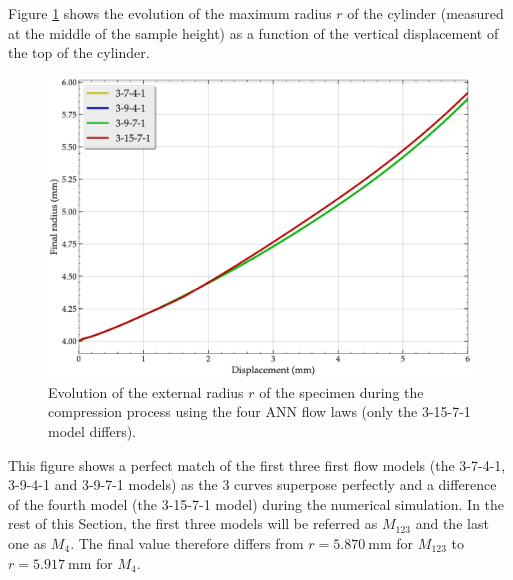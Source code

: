 \documentclass[algorithms,article,submit,pdftex,moreauthors]{Definitions/mdpi}
\begin{document}
Figure \ref{fig:radiusCurve} shows the evolution of the maximum radius $r$ of the cylinder (measured at the middle of the sample height) as a function of the vertical displacement of the top of the cylinder.
\begin{figure}[!ht]
\centering
\includegraphics[width=0.75\columnwidth]{Figures/radiusCurve}
\caption{Evolution of the external radius $r$ of the specimen during the compression process using the four ANN flow laws (only the 3-15-7-1 model differs).}
\label{fig:radiusCurve}
\end{figure}
This figure shows a perfect match of the first three first flow models (the 3-7-4-1, 3-9-4-1 and 3-9-7-1 models) as the 3 curves superpose perfectly and a difference of the fourth model (the 3-15-7-1 model) during the numerical simulation.
In the rest of this Section, the first three models will be referred as $M_{123}$ and the last one as $M_4$.
The final value therefore differs from $r=5.870~\text{mm}$ for $M_{123}$ to  $r=5.917~\text{mm}$ for $M_4$.
\end{document}
